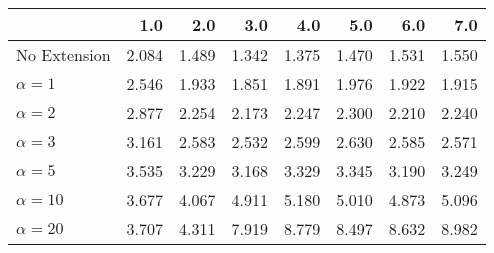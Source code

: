 \begin{tabular}{lrrrrrrr}
\toprule
{} &   1.0 &   2.0 &   3.0 &   4.0 &   5.0 &   6.0 &   7.0 \\
\midrule
No Extension  & 2.084 & 1.489 & 1.342 & 1.375 & 1.470 & 1.531 & 1.550 \\
$\alpha = 1$  & 2.546 & 1.933 & 1.851 & 1.891 & 1.976 & 1.922 & 1.915 \\
$\alpha = 2$  & 2.877 & 2.254 & 2.173 & 2.247 & 2.300 & 2.210 & 2.240 \\
$\alpha = 3$  & 3.161 & 2.583 & 2.532 & 2.599 & 2.630 & 2.585 & 2.571 \\
$\alpha = 5$  & 3.535 & 3.229 & 3.168 & 3.329 & 3.345 & 3.190 & 3.249 \\
$\alpha = 10$ & 3.677 & 4.067 & 4.911 & 5.180 & 5.010 & 4.873 & 5.096 \\
$\alpha = 20$ & 3.707 & 4.311 & 7.919 & 8.779 & 8.497 & 8.632 & 8.982 \\
\bottomrule
\end{tabular}
